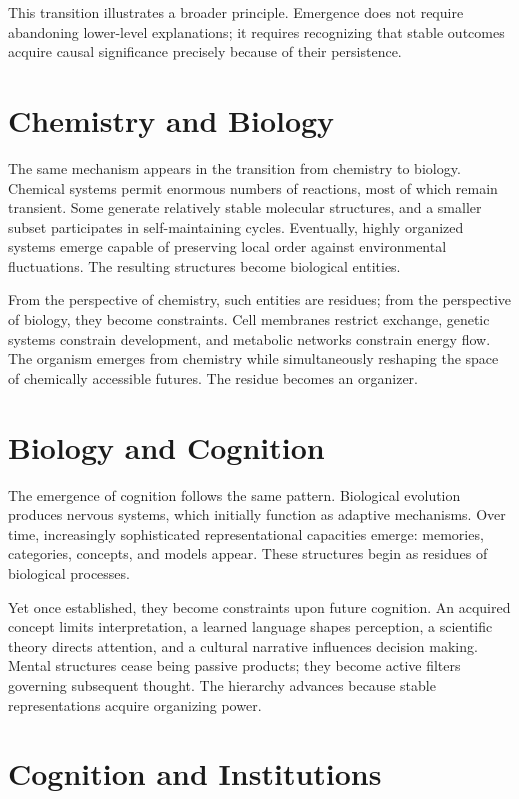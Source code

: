 \documentclass[11pt,oneside]{book}
\theoremstyle{plain}
\theoremstyle{definition}
\theoremstyle{remark}
\begin{document}
This transition illustrates a broader principle. Emergence does not require abandoning lower-level explanations; it requires recognizing that stable outcomes acquire causal significance precisely because of their persistence.

\section{Chemistry and Biology}

The same mechanism appears in the transition from chemistry to biology. Chemical systems permit enormous numbers of reactions, most of which remain transient. Some generate relatively stable molecular structures, and a smaller subset participates in self-maintaining cycles. Eventually, highly organized systems emerge capable of preserving local order against environmental fluctuations. The resulting structures become biological entities.

From the perspective of chemistry, such entities are residues; from the perspective of biology, they become constraints. Cell membranes restrict exchange, genetic systems constrain development, and metabolic networks constrain energy flow. The organism emerges from chemistry while simultaneously reshaping the space of chemically accessible futures. The residue becomes an organizer.

\section{Biology and Cognition}

The emergence of cognition follows the same pattern. Biological evolution produces nervous systems, which initially function as adaptive mechanisms. Over time, increasingly sophisticated representational capacities emerge: memories, categories, concepts, and models appear. These structures begin as residues of biological processes.

Yet once established, they become constraints upon future cognition. An acquired concept limits interpretation, a learned language shapes perception, a scientific theory directs attention, and a cultural narrative influences decision making. Mental structures cease being passive products; they become active filters governing subsequent thought. The hierarchy advances because stable representations acquire organizing power.

\section{Cognition and Institutions}
\end{document}
